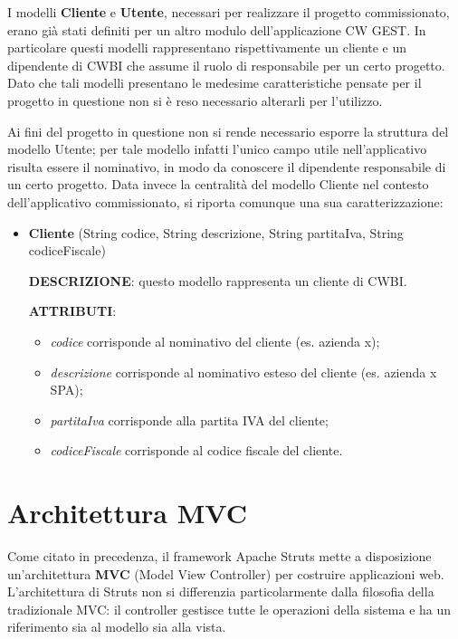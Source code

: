 \setlength{\parskip}{6ex}

\noindent I modelli \textbf{Cliente} e \textbf{Utente}, necessari per realizzare il progetto commissionato, erano già stati definiti per un altro modulo dell'applicazione CW GEST. In particolare questi modelli rappresentano rispettivamente un cliente e un dipendente di CWBI che assume il ruolo di responsabile per un certo progetto. Dato che tali modelli presentano le medesime caratteristiche pensate per il progetto in questione non si è reso necessario alterarli per l'utilizzo.

\setlength{\parskip}{3ex}

\noindent Ai fini del progetto in questione non si rende necessario esporre la struttura del modello Utente; per tale modello infatti l'unico campo utile nell'applicativo risulta essere il nominativo, in modo da conoscere il dipendente responsabile di un certo progetto. Data invece la centralità del modello Cliente nel contesto dell'applicativo commissionato, si riporta comunque una sua caratterizzazione:
\begin{itemize}
\item \textbf{Cliente} (String codice, String descrizione, String partitaIva, String codiceFiscale)

\setlength{\parskip}{3ex}

\textbf{DESCRIZIONE}: questo modello rappresenta un cliente di CWBI.

\setlength{\parskip}{3ex}

\textbf{ATTRIBUTI}:
\begin{itemize}
\item \textit{codice} corrisponde al nominativo del cliente (es. azienda x);
\item \textit{descrizione} corrisponde al nominativo esteso del cliente (es. azienda x SPA);
\item \textit{partitaIva} corrisponde alla partita IVA del cliente;
\item \textit{codiceFiscale} corrisponde al codice fiscale del cliente.
\end{itemize}
\end{itemize} 

\pagebreak

\section{Architettura MVC}
Come citato in precedenza, il framework Apache Struts mette a disposizione un'architettura \textbf{MVC} (Model View Controller) per costruire applicazioni web. \\
L'architettura di Struts non si differenzia particolarmente dalla filosofia della tradizionale MVC: il controller gestisce tutte le operazioni della sistema e ha un riferimento sia al modello sia alla vista. 

